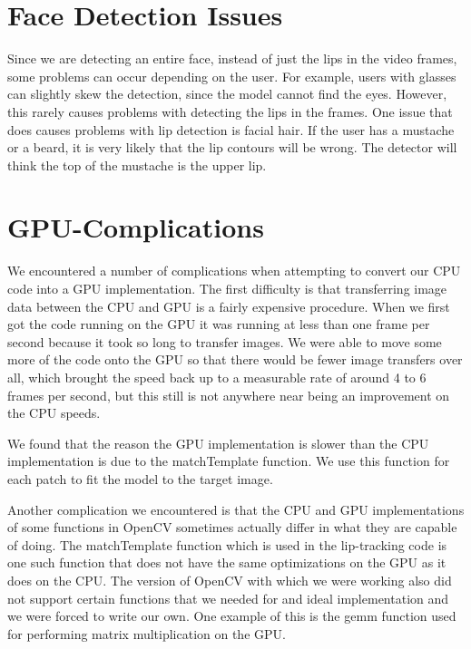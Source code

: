 \section{Face Detection Issues}
Since we are detecting an entire face, instead of just the lips in the video frames, some problems can occur depending on the user. For example, users with glasses can slightly skew the detection, since the model cannot find the eyes. However, this rarely causes problems with detecting the lips in the frames. One issue that does causes problems with lip detection is facial hair. If the user has a mustache or a beard, it is very likely that the lip contours will be wrong. The detector will think the top of the mustache is the upper lip.

\section{GPU-Complications}

We encountered a number of complications when attempting to convert our CPU code into a GPU implementation. The first difficulty is that transferring image data between the CPU and GPU is a fairly expensive procedure. When we first got the code running on the GPU it was running at less than one frame per second because it took so long to transfer images. We were able to move some more of the code onto the GPU so that there would be fewer image transfers over all, which brought the speed back up to a measurable rate of around 4 to 6 frames per second, but this still is not anywhere near being an improvement on the CPU speeds.

We found that the reason the GPU implementation is slower than the CPU implementation is due to the matchTemplate function. We use this function for each patch to fit the model to the target image.

Another complication we encountered is that the CPU and GPU implementations of some functions in OpenCV sometimes actually differ in what they are capable of doing. The matchTemplate function which is used in the lip-tracking code is one such function that does not have the same optimizations on the GPU as it does on the CPU. The version of OpenCV with which we were working also did not support certain functions that we needed for and ideal implementation and we were forced to write our own. One example of this is the gemm function used for performing matrix multiplication on the GPU.